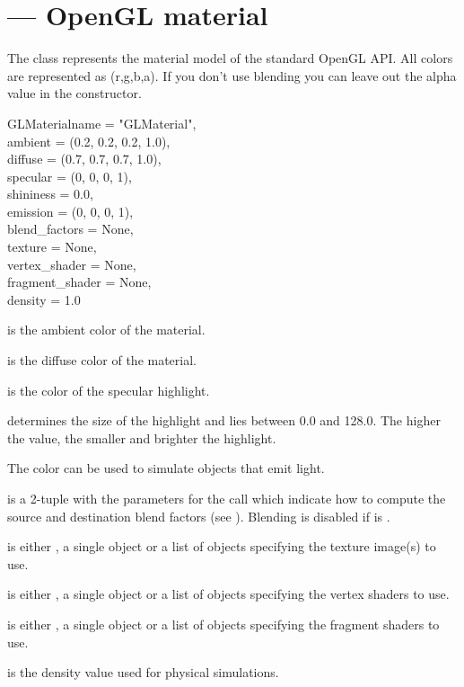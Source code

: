 
\section{ ---
         OpenGL material}

The  class represents the material model of the standard
OpenGL API. All colors are represented as (r,g,b,a). If you don't use
blending you can leave out the alpha value in the constructor.

\begin{classdesc}{GLMaterial}{name = "GLMaterial",\\ 
                              ambient = (0.2, 0.2, 0.2, 1.0),\\
                              diffuse = (0.7, 0.7, 0.7, 1.0),\\
                              specular = (0, 0, 0, 1),\\
                              shininess = 0.0,\\
                              emission = (0, 0, 0, 1),\\
                              blend_factors = None,\\
                              texture = None,\\
                              vertex_shader = None,\\
                              fragment_shader = None,\\
                              density = 1.0}

 is the ambient color of the material.

 is the diffuse color of the material.

 is the color of the specular highlight.

 determines the size of the highlight and lies 
between 0.0 and 128.0. The higher the value, the smaller and brighter
the highlight.

The  color can be used to simulate objects that emit light.

 is a 2-tuple with the parameters for the 
 call which indicate how to compute the
source and destination blend factors 
(see ).
Blending is disabled if  is .

 is either , a single  object or
a list of  objects specifying the texture image(s) to use.

 is either , a single  object
or a list of  objects specifying the vertex shaders to use.

 is either , a single  object
or a list of  objects specifying the fragment shaders to use.

 is the density value used for physical simulations.
\end{classdesc}


